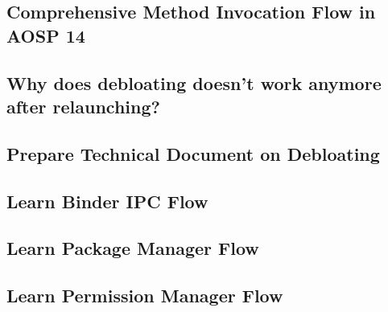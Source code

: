 \label{task:20240610_aosp}

\subsection{Comprehensive Method Invocation Flow in AOSP 14}

\subsection{Why does debloating doesn't work anymore after relaunching?}

\subsection{Prepare Technical Document on Debloating}

\subsection{Learn Binder IPC Flow}

\subsection{Learn Package Manager Flow}

\subsection{Learn Permission Manager Flow}

% 





